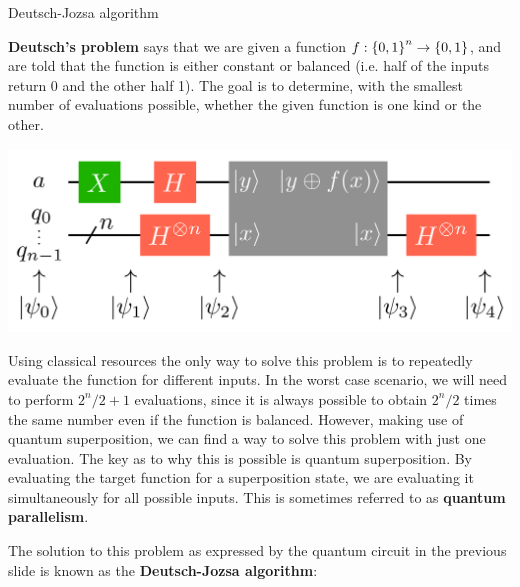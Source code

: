 \documentclass[9pt, handout, aspectratio=169]{beamer}	%
\begin{document}

\begin{frame}[allowframebreaks]{Deutsch-Jozsa algorithm}

	\begin{multicols}{2}

		\textbf{Deutsch’s problem} says that we are given a function $f: \qty{0,1}^n \rightarrow \qty{0,1}$, and are told that the function is either constant or balanced (i.e. half of the inputs return 0 and the other half 1). The goal is to determine, with the smallest number of evaluations possible, whether the given function is one kind or the other.

		\columnbreak

		\begin{center}
			\includegraphics[width=.40\paperwidth]{Figures/quantum-background/deutsch-jozsa-algorithm}
		\end{center}

	\end{multicols}

	Using classical resources the only way to solve this problem is to repeatedly evaluate the function for different inputs. In the worst case scenario, we will need to perform $2^n/2+1$ evaluations, since it is always possible to obtain $2^n/2$ times the same number even if the function is balanced. However, making use of quantum superposition, we can find a way to solve this problem with just one evaluation. The key as to why this is possible is quantum superposition. By evaluating the target function for a superposition state, we are evaluating it simultaneously for all possible inputs. This is sometimes referred to as \textbf{quantum parallelism}.

\break

	The solution to this problem as expressed by the quantum circuit in the previous slide is known as the \textbf{Deutsch-Jozsa algorithm}:

	\begin{multicols}{2}


\end{multicols}
\end{frame}
\end{document}
